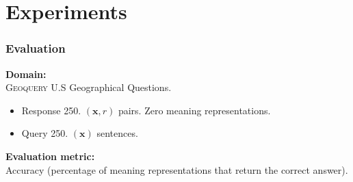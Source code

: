 

\section{Experiments}



\begin{frame}
  \frametitle{Evaluation}

    \textbf{Domain:}\\
    \textsc{Geoquery}  U.S Geographical Questions.
    \begin{itemize}
    \item Response 250. $(\mathbf{x}, r)$ pairs. Zero meaning representations.
    \item Query 250. $(\mathbf{x})$ sentences.
    \end{itemize}
    \vspace{3ex}
    \textbf{Evaluation metric:}\\
    Accuracy (percentage of meaning representations that
    return the correct answer).

  
\end{frame}




